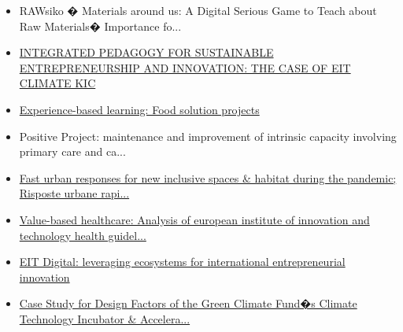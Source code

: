 \begin{itemize}[leftmargin=*, itemsep=0em, label=\textbullet]
\item RAWsiko � Materials around us: A Digital Serious Game to Teach about Raw Materials� Importance fo...
\item \href{https://doi.org/10.5465/AMBPP.2021.105}{INTEGRATED PEDAGOGY FOR SUSTAINABLE ENTREPRENEURSHIP AND INNOVATION: THE CASE OF EIT CLIMATE KIC}
\item \href{https://doi.org/10.1016/B978-0-12-821292-9.00025-X}{Experience-based learning: Food solution projects}
\item Positive Project: maintenance and improvement of intrinsic capacity involving primary care and ca...
\item \href{https://doi.org/10.3280/tr2021-097-Supplementooa12938}{Fast urban responses for new inclusive spaces \& habitat during the pandemic; Risposte urbane rapi...}
\item \href{https://doi.org/10.17116/medtech20214301128}{Value-based healthcare: Analysis of european institute of innovation and technology health guidel...}
\item \href{https://doi.org/10.1080/13511610.2020.1842177}{EIT Digital: leveraging ecosystems for international entrepreneurial innovation}
\item \href{https://doi.org/10.15531/KSCCR.2021.12.2.163}{Case Study for Design Factors of the Green Climate Fund�s Climate Technology Incubator \& Accelera...}
\end{itemize}

